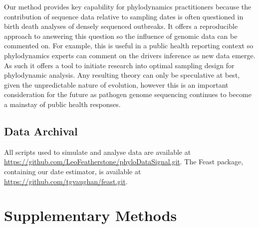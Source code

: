 \documentclass{article}
\begin{document}
Our method provides key capability for phylodynamics practitioners because the contribution of sequence data relative to sampling dates is often questioned in birth death analyses of densely sequenced outbreaks. It offers a reproducible approach to answering this question so the influence of genomic data can be commented on. For example, this is useful in a public health reporting context so phylodynamics experts can comment on the drivers inference as new data emerge. As such it offers a tool to initiate research into optimal sampling design for phylodynamic analysis. Any resulting theory can only be speculative at best, given the unpredictable nature of evolution, however this is an important consideration for the future as pathogen genome sequencing continues to become a mainstay of public health responses.

\subsection*{Data Archival}
All scripts used to simulate and analyse data are available at \url{https://github.com/LeoFeatherstone/phyloDataSignal.git}. The Feast package, containing our date estimator, is available at \url{https://github.com/tgvaughan/feast.git}.
\section*{Supplementary Methods}
\end{document}
